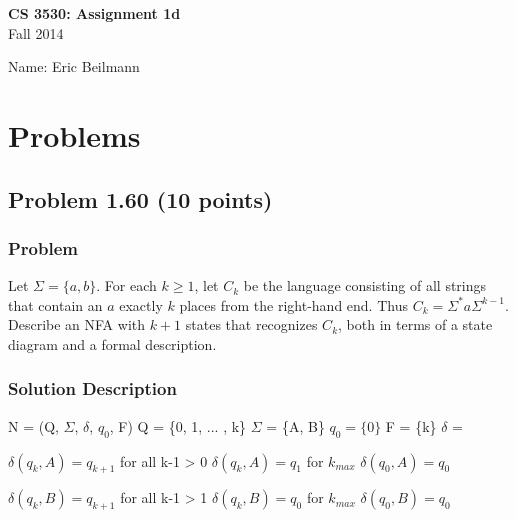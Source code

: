 \documentclass{article}
\begin{document}
\begin{empfile}

\begin{center}
\textbf{\Large CS 3530: Assignment 1d} \\[2mm]
Fall 2014
\end{center}

Name: Eric Beilmann

\raggedright

\section*{Problems}

\subsection*{Problem 1.60 (10 points)}

\subsubsection*{Problem}

Let $\Sigma=\{a,b\}$. For each $k\geq 1$, let $C_k$ be the language
consisting of all strings that contain an $a$ exactly $k$ places
from the right-hand end. Thus $C_k=\Sigma^*a\Sigma^{k-1}$. Describe
an NFA with $k+1$ states that recognizes $C_k$, both in terms of a
state diagram and a formal description.

\subsubsection*{Solution Description}


N = (Q, $\Sigma$, $\delta$, $q_0$, F) \newline 
Q = \{0, 1, ... , k\} \newline
$\Sigma$ = \{A, B\} \newline
$q_0 = \{0\}$ \newline 
F = \{k\} \newline 
$\delta$ = \newline

$\delta (q_k,A) = q_{k+1}$ for all k-1 > 0 \newline
$\delta (q_k,A) = q_1$ for $k_{max}$ \newline
$\delta (q_0,A) = q_0$ \newline

$\delta (q_k,B) = q_{k+1}$ for all k-1 > 1 \newline
$\delta (q_k,B) = q_0$ for $k_{max}$ \newline
$\delta (q_0,B) = q_0$ \newline


\end{empfile}
\end{document}
